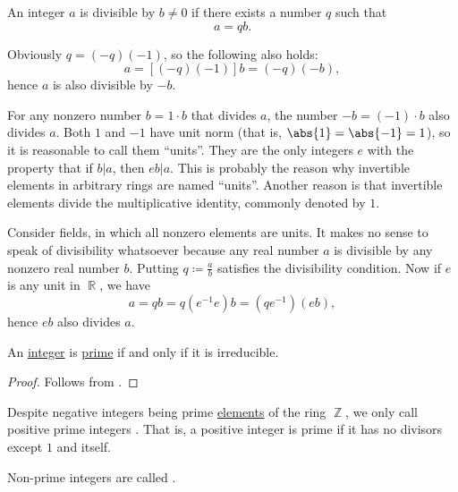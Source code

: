 \begin{remark}\label{rem:units_in_rings_etymology}
  An integer \( a \) is divisible by \( b \neq 0 \) if there exists a number \( q \) such that
  \begin{equation*}
    a = qb.
  \end{equation*}

  Obviously \( q = (-q)(-1) \), so the following also holds:
  \begin{equation*}
    a = [(-q)(-1)]b = (-q)(-b),
  \end{equation*}
  hence \( a \) is also divisible by \( -b \).

  For any nonzero number \( b = 1 \cdot b \) that divides \( a \), the number \( -b = (-1) \cdot b \) also divides \( a \). Both \( 1 \) and \( -1 \) have unit norm (that is, \( \abs{1} = \abs{-1} = 1 \)), so it is reasonable to call them \enquote{units}. They are the only integers \( e \) with the property that if \( b | a \), then \( eb | a \). This is probably the reason why invertible elements in arbitrary rings are named \enquote{units}. Another reason is that invertible elements divide the multiplicative identity, commonly denoted by \( 1 \).

  Consider fields, in which all nonzero elements are units. It makes no sense to speak of divisibility whatsoever because any real number \( a \) is divisible by any nonzero real number \( b \). Putting \( q \coloneqq \frac a b \) satisfies the divisibility condition. Now if \( e \) is any unit in \( \BbbR \), we have
  \begin{equation*}
    a = qb = q(e^{-1} e) b = (qe^{-1}) (eb),
  \end{equation*}
  hence \( eb \) also divides \( a \).
\end{remark}

\begin{lemma}\label{thm:euclids_lemma}
  An \hyperref[def:integers]{integer} is \hyperref[def:prime_ring_ideal]{prime} if and only if it is irreducible.
\end{lemma}
\begin{proof}
  Follows from .
\end{proof}

\begin{definition}\label{def:prime_number}
  Despite negative integers being prime \hyperref[thm:euclids_lemma]{elements} of the ring \( \BbbZ \), we only call positive prime integers . That is, a positive integer is prime if it has no divisors except \( 1 \) and itself.

  Non-prime integers are called .
\end{definition}

